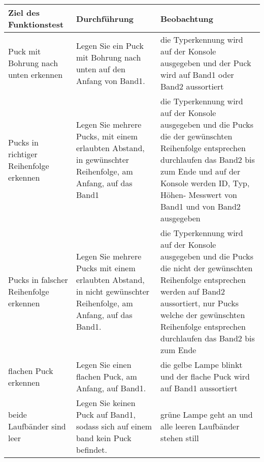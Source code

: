 \documentclass[
   draft=false
  ,paper=a4
  ,twoside=false
  ,fontsize=11pt
  ,headsepline
  ,DIV11
  ,parskip=full+
]{scrartcl} %
\begin{document}


\newlength{\txtw} %
\setlength{\txtw}{\textwidth} %
\addtolength{\txtw}{-10\tabcolsep} %


\def\tablehead{
	\hline 
	\rowcolor{tabgrey}
	\textbf{Ziel des Funktionstest} & 
	\textbf{Durchführung} &
	\textbf{Beobachtung} 
 \\
	\hline 
	\endhead}

\vspace{-1em}
\begin{longtable}{
	|p{0.30\txtw} %
	|p{0.30\txtw} %
	|p{0.30\txtw} %
|}
	\tablehead

	Puck mit Bohrung nach unten erkennen & Legen Sie ein Puck mit Bohrung nach unten auf den Anfang von Band1. & die Typerkennung wird auf der Konsole ausgegeben und der Puck wird auf Band1 oder Band2 aussortiert
	\\ \hline
	
	Pucks in richtiger Reihenfolge erkennen & Legen Sie mehrere Pucks, mit einem erlaubten Abstand, in gewünschter Reihenfolge, am Anfang, auf das Band1 & die Typerkennung wird auf der Konsole ausgegeben und die Pucks die der gewünschten Reihenfolge entsprechen durchlaufen das Band2 bis zum Ende und auf der Konsole werden ID, Typ, Höhen- Messwert von Band1 und von Band2 ausgegeben
	\\ \hline

	Pucks in falscher Reihenfolge erkennen & Legen Sie mehrere Pucks mit einem erlaubten Abstand, in nicht gewünschter Reihenfolge, am Anfang, auf das Band1. & die Typerkennung wird auf der Konsole ausgegeben und die Pucks die nicht der gewünschten Reihenfolge entsprechen werden auf Band2 aussortiert, nur Pucks welche der gewünschten Reihenfolge entsprechen durchlaufen das Band2 bis zum Ende 
	\\ \hline
	
	flachen Puck erkennen & Legen Sie einen flachen Puck, am Anfang, auf Band1. & die gelbe Lampe blinkt und der flache Puck wird auf Band1 aussortiert
	\\ \hline 
    
    beide Laufbänder sind leer & Legen Sie keinen Puck auf Band1, sodass sich auf einem band kein Puck befindet. & grüne Lampe geht an und alle leeren Laufbänder stehen still
	\\ \hline 
	

\end{longtable}
\end{document}
